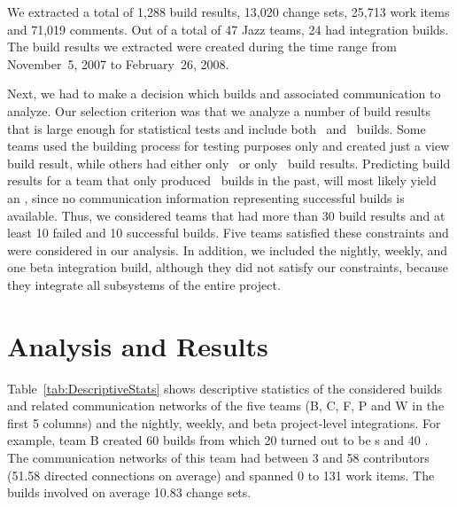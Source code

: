 We extracted a total of 1,288 build results, 13,020 change sets, 25,713 work items
and 71,019 comments. Out of a total of 47 Jazz teams, 24 had integration builds.
The build results we extracted were created during the time range from
November~5, 2007 to February~26, 2008.

Next, we had to make a decision which builds and associated communication to
analyze. Our selection criterion was that we analyze a number of build results
that is large enough for statistical tests and include both \ok\ and \error\
builds. Some teams used the building process for testing purposes only and created
just a view build result, while others had either only \ok\ or only \error\
build results. Predicting build results for a team that only produced \error\
builds in the past, will most likely yield an \error, since no communication
information representing successful builds is available. Thus, we considered
teams that had more than 30 build results and at least 10 failed and 10
successful builds. Five teams satisfied these constraints and were considered in
our analysis. In addition, we included the nightly, weekly, and one beta
integration build, although they did not satisfy our constraints, because 
they integrate all subsystems of the entire project.






\section{Analysis and Results}
\label{sec:AnalysisResults}
Table~\ref{tab:DescriptiveStats} shows descriptive statistics of the considered
builds and related communication networks of the five teams (B, C, F, P and W in
the first 5 columns) and the nightly, weekly, and beta project-level
integrations. For example, team B created 60 builds from which 20 turned out to
be \error s and 40 \ok. The communication networks of this team had between 3 and
58 contributors (51.58 directed connections on average) and spanned 0 to 131 work
items. The builds involved on average 10.83 change sets.

